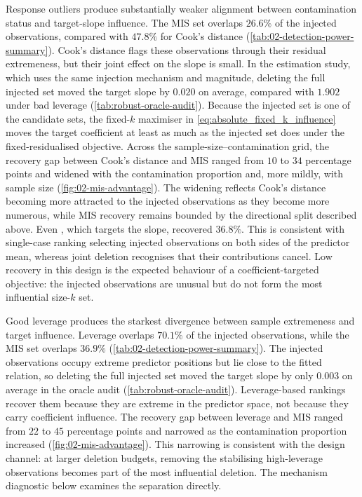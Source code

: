 \documentclass[../main.tex]{subfiles}
\begin{document}
Response outliers produce substantially weaker alignment between contamination status and target-slope influence. The MIS set overlaps \(26.6\%\) of the injected observations, compared with \(47.8\%\) for Cook's distance (\autoref{tab:02-detection-power-summary}). Cook's distance flags these observations through their residual extremeness, but their joint effect on the slope is small. In the estimation study, which uses the same injection mechanism and magnitude, deleting the full injected set moved the target slope by \(0.020\) on average, compared with \(1.902\) under bad leverage (\autoref{tab:robust-oracle-audit}). Because the injected set is one of the candidate sets, the fixed-\(k\) maximiser in \autoref{eq:absolute_fixed_k_influence} moves the target coefficient at least as much as the injected set does under the fixed-residualised objective. Across the sample-size--contamination grid, the recovery gap between Cook's distance and MIS ranged from \(10\) to \(34\) percentage points and widened with the contamination proportion and, more mildly, with sample size (\autoref{fig:02-mis-advantage}). The widening reflects Cook's distance becoming more attracted to the injected observations as they become more numerous, while MIS recovery remains bounded by the directional split described above. Even \dfbetas{}, which targets the slope, recovered \(36.8\%\). This is consistent with single-case ranking selecting injected observations on both sides of the predictor mean, whereas joint deletion recognises that their contributions cancel. Low recovery in this design is the expected behaviour of a coefficient-targeted objective: the injected observations are unusual but do not form the most influential size-\(k\) set.

Good leverage produces the starkest divergence between sample extremeness and target influence. Leverage overlaps \(70.1\%\) of the injected observations, while the MIS set overlaps \(36.9\%\) (\autoref{tab:02-detection-power-summary}). The injected observations occupy extreme predictor positions but lie close to the fitted relation, so deleting the full injected set moved the target slope by only \(0.003\) on average in the oracle audit (\autoref{tab:robust-oracle-audit}). Leverage-based rankings recover them because they are extreme in the predictor space, not because they carry coefficient influence. The recovery gap between leverage and MIS ranged from \(22\) to \(45\) percentage points and narrowed as the contamination proportion increased (\autoref{fig:02-mis-advantage}). This narrowing is consistent with the design channel: at larger deletion budgets, removing the stabilising high-leverage observations becomes part of the most influential deletion. The mechanism diagnostic below examines the separation directly.
\end{document}
